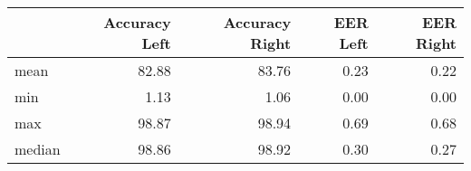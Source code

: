 \begin{tabular}{lrrrr}
\toprule
{} &  Accuracy Left &  Accuracy Right &  EER Left &  EER Right \\
\midrule
mean   &          82.88 &           83.76 &      0.23 &       0.22 \\
min    &           1.13 &            1.06 &      0.00 &       0.00 \\
max    &          98.87 &           98.94 &      0.69 &       0.68 \\
median &          98.86 &           98.92 &      0.30 &       0.27 \\
\bottomrule
\end{tabular}

